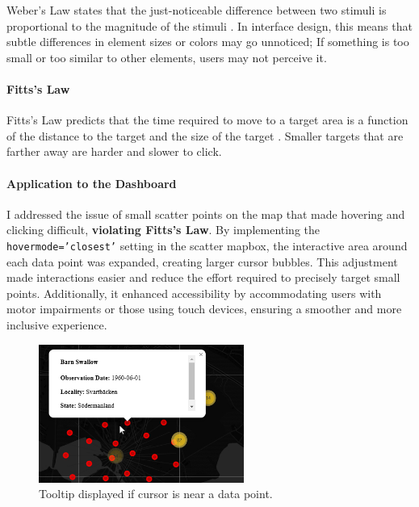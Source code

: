Weber's Law states that the just-noticeable difference between two stimuli is proportional to the magnitude of the stimuli \cite{mccrocklinInteractionDesignData2015}. In interface design, this means that subtle differences in element sizes or colors may go unnoticed; If something is too small or too similar to other elements, users may not perceive it.

\paragraph{Fitts's Law}

Fitts's Law predicts that the time required to move to a target area is a function of the distance to the target and the size of the target \cite{mccrocklinInteractionDesignData2015}. Smaller targets that are farther away are harder and slower to click.

\paragraph{Application to the Dashboard}
I addressed the issue of small scatter points on the map that made hovering and clicking difficult, \textbf{violating Fitts's Law}. By implementing the \texttt{hovermode='closest'} setting in the scatter mapbox, the interactive area around each data point was expanded, creating larger cursor bubbles. This adjustment made interactions easier and reduce the effort required to precisely target small points. Additionally, it enhanced accessibility by accommodating users with motor impairments or those using touch devices, ensuring a smoother and more inclusive experience.

\begin{figure}[H] 
    \centering 
    \includegraphics[width=0.6\textwidth]{figures/cursor_bubbles_v2.jpg} 
    \caption{Tooltip displayed if cursor is near a data point.} 
    \label{fig:cursor_bubbles} 
\end{figure}

